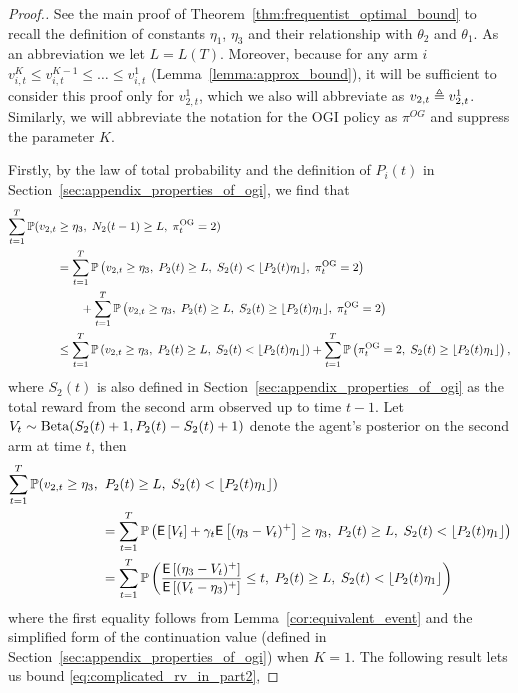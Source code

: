 \begin{proof}[Proof.]
	See the main proof of Theorem~\ref{thm:frequentist_optimal_bound} to recall the definition of constants $\eta_1$, $\eta_3$ and their relationship with $\theta_2$ and $\theta_1$. As an abbreviation we let $L = L(T)$. Moreover, because for any arm $i$ $v^K_{i,t} \le v^{K-1}_{i,t} \le \ldots \le v^1_{i,t}$ (Lemma~\ref{lemma:approx_bound}), it will be sufficient to consider this proof only for $v^1_{2,t}$, which we also will abbreviate as $v_{2,t} \triangleq v^1_{2,t}$. Similarly, we will abbreviate the notation for the OGI policy as $\pi^{OG}$ and suppress the parameter $K$.
	
	Firstly, by the law of total probability and the definition of $P_i(t)$ in Section~\ref{sec:appendix_properties_of_ogi}, we find that
	\begin{align} 
	\sum_{t=1}^T \mathbb{P}(v_{2,t} & \ge \eta_3 ,\; N_{2}(t-1) \ge L,\; \pi^{\rm OG}_t = 2) \nonumber \\
	& = \sum_{t=1}^T \mathbb{P} \left( v_{2,t} \ge \eta_3 ,\; P_{2}(t) \ge L, \; S_2(t) < \lfloor P_{2}(t) \eta_1\rfloor, \; \pi^{\rm OG}_t = 2 \right) \nonumber \\
	& \qquad + \sum_{t=1}^T \mathbb{P} \left( v_{2,t} \ge \eta_3 ,\; P_{2}(t) \ge L, \; S_2(t) \ge \lfloor P_{2}(t) \eta_1\rfloor,\; \pi^{\rm OG}_t = 2 \right) \nonumber \\
	& \le \sum_{t=1}^T \mathbb{P} \left( v_{2,t} \ge \eta_3 ,\; P_{2}(t) \ge L, \; S_2(t) < \lfloor P_{2}(t) \eta_1\rfloor \right) + \sum_{t=1}^T \mathbb{P} \left( \pi^{\rm OG}_t = 2,\; S_2(t) \ge \lfloor P_{2}(t) \eta_1\rfloor \right) \label{eqn:splitting_not_underestimate},
	\end{align}
	where $S_2(t)$ is also defined in Section~\ref{sec:appendix_properties_of_ogi} as the total reward from the second arm observed up to time $t-1$. Let $V_t \sim \text{Beta}(S_2(t) + 1, P_{2}(t)- S_2(t) + 1)$ denote the agent's posterior on the second arm at time $t$, then
	\begin{align}
	\sum_{t=1}^T \mathbb{P}(v_{2,t} \ge \eta_3 ,\; & \; P_{2}(t) \ge L,\; S_2(t) < \lfloor P_{2}(t) \eta_1\rfloor)  \nonumber\\
	& = \sum_{t=1}^T \mathbb{P} \left( \mathsf{E} \left[ V_t \right] + \gamma_t \mathsf{E} \left[ (\eta_3 - V_t)^+ \right] \ge \eta_3, \; P_{2}(t) \ge L,\; S_2(t) < \lfloor P_{2}(t) \eta_1\rfloor \right) \nonumber \\
	& = \sum_{t=1}^T \mathbb{P} \left( \frac{\mathsf{E} \left[ (\eta_3-V_t)^+  \right]}{  \mathsf{E} \left[ (V_t - \eta_3)^+  \right]} \le t , \; P_{2}(t) \ge L,\; S_2(t) < \lfloor P_{2}(t) \eta_1\rfloor \right) \label{eq:complicated_rv_in_part2}
	\end{align}
	where the first equality follows from Lemma~\ref{cor:equivalent_event} and the simplified form of the continuation value (defined in Section~\ref{sec:appendix_properties_of_ogi}) when $K = 1$. The following result lets us bound \eqref{eq:complicated_rv_in_part2},

\end{proof}
